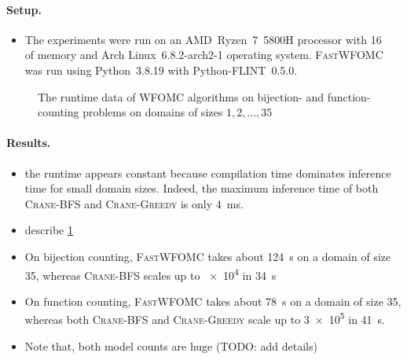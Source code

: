 \documentclass{article}
\begin{document}
\paragraph{Setup.}
\begin{itemize}
  \item The experiments were run on an AMD~Ryzen~7~5800H processor with
        \SI{16}{\gibi\byte} of memory and Arch Linux~6.8.2-arch2-1 operating
        system. \textsc{FastWFOMC} was run using Python~3.8.19 with
        Python-FLINT~0.5.0.
\end{itemize}

\begin{figure}
  \centering
  
  \caption{The runtime data of WFOMC algorithms on bijection- and
    function-counting problems on domains of sizes
    $1, 2, \dots, 35$}\label{fig:plot}
\end{figure}

\paragraph{Results.}
\begin{itemize}
  \item the runtime appears constant because compilation time dominates
        inference time for small domain sizes. Indeed, the maximum inference
        time of both \textsc{Crane-BFS} and \textsc{Crane-Greedy} is only
        \SI{4}{\milli\second}.
  \item describe \cref{fig:plot}
  \item On bijection counting, \textsc{FastWFOMC} takes about \SI{124}{\second}
        on a domain of size 35, whereas \textsc{Crane-BFS} scales up to
        \num{e4} in \SI{34}{\second}
  \item On function counting, \textsc{FastWFOMC} takes about \SI{78}{\second} on
        a domain of size 35, whereas both \textsc{Crane-BFS} and
        \textsc{Crane-Greedy} scale up to \num{3e5} in \SI{41}{\second}.
  \item Note that, both model counts are huge (TODO: add details)
\end{itemize}
\end{document}
